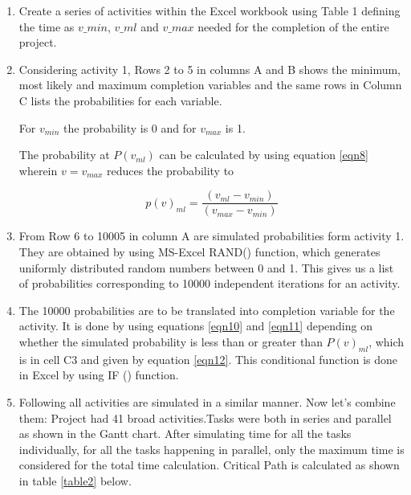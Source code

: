 \begin{enumerate}
	\item Create a series of activities within the Excel workbook using Table 1 defining the time as $v\_min$, $v\_ml$ and $v\_max$ needed for the completion of the entire project.
	
	\item Considering activity 1, Rows 2 to 5 in columns A and B shows the minimum, most likely and maximum completion variables and the same rows in Column C lists the probabilities for each variable.
	
For $v_ {min} $ the probability is 0 and for $v_ {max} $ is 1. 

The probability at $P (v_ {ml}) $ can be calculated by using equation \ref{eqn8} wherein $v = v_ {max} $ reduces the probability to 

\begin{equation}
p(v)_{ml}  = \frac{(v_{ml} - v_{min})}{  (v_{max} - v_{min}) } 
\label{eqn5.1}
\end{equation}

\item From Row 6 to 10005 in column A are simulated probabilities form activity 1. They are obtained by using MS-Excel RAND() function, which generates uniformly distributed random numbers between 0 and 1. This gives us a list of probabilities corresponding to 10000 independent iterations for an activity.

\item The 10000 probabilities are to be translated into completion variable for the activity. It is done by using equations \ref{eqn10} and \ref{eqn11} depending on whether the simulated probability is less than or greater than $P(v)_ {ml}$, which is in cell C3 and given by equation \ref{eqn12}. This conditional function is done in Excel by using IF () function.

\item Following all activities are simulated in a similar manner. Now let's combine them: Project had 41 broad activities.Tasks were both in series and parallel as shown in the Gantt chart. After simulating time for all the tasks individually, for all the tasks happening in parallel, only the maximum time is considered for the total time calculation. Critical Path is calculated as shown in table \ref{table2} below.

\begin{center}
	\begin{tabular}{ |c|c|c|c|c| c|} 


\end{tabular}
\end{center}
\end{enumerate}
